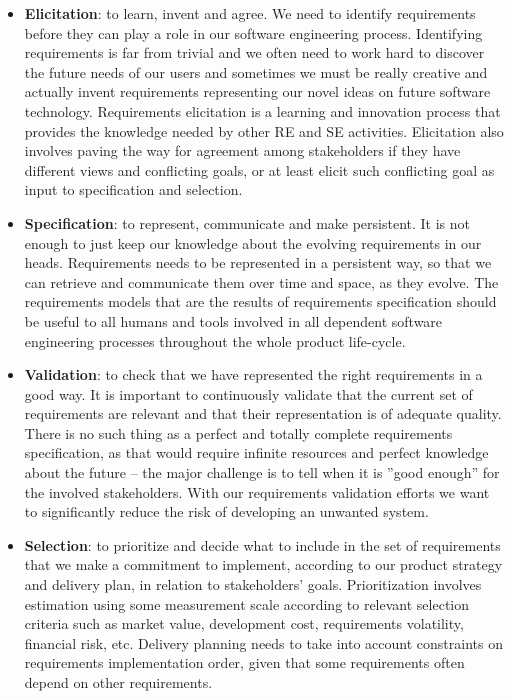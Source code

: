 \begin{itemize}
  \item \textbf{Elicitation}: to learn, invent and agree. We need to identify requirements before they can play a role in our software engineering process. Identifying requirements is far from trivial and we often need to work hard to discover the future needs of our users and sometimes we must be really creative and actually invent requirements representing our novel ideas on future software technology. Requirements elicitation is a learning and innovation process that provides the knowledge needed by other RE and SE activities. Elicitation also involves paving the way for agreement among stakeholders  if they have different views and conflicting goals, or at least elicit such conflicting goal as input to specification and selection.
  \item \textbf{Specification}: to represent, communicate and make persistent. It is not enough to just keep our knowledge about the evolving requirements in our heads. Requirements needs to be represented in a persistent way, so that we can retrieve and communicate them over time and space, as they evolve. The requirements models that are the results of requirements specification should be useful to all humans and tools involved in all dependent software engineering processes throughout the whole product life-cycle.
  \item \textbf{Validation}: to check that we have represented the right requirements in a good way. It is important to continuously validate that the current set of requirements are relevant and that their representation is of adequate quality. There is no such thing as a perfect and totally complete requirements specification, as that would require infinite resources and perfect knowledge about the future -- the major challenge is to tell when it is ''good enough'' for the involved stakeholders. With our requirements validation efforts we want to significantly reduce the risk of developing an unwanted system.
  \item \textbf{Selection}: to prioritize and decide what to include in the set of requirements that we make a commitment to implement, according to our product strategy and delivery plan, in relation to stakeholders' goals. Prioritization involves estimation using some measurement scale according to relevant selection criteria such as market value, development cost, requirements volatility, financial risk, etc. Delivery planning needs to take into account constraints on requirements implementation order, given that some requirements often depend on other requirements. 
\end{itemize}

